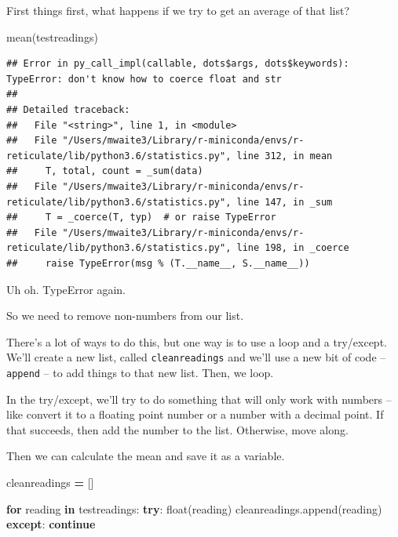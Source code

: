\documentclass[
]{book}
\newenvironment{Shaded}{\begin{snugshade}}{\end{snugshade}}
\newcommand{\BuiltInTok}[1]{#1}
\newcommand{\ControlFlowTok}[1]{\textcolor[rgb]{0.13,0.29,0.53}{\textbf{#1}}}
\newcommand{\KeywordTok}[1]{\textcolor[rgb]{0.13,0.29,0.53}{\textbf{#1}}}
\newcommand{\NormalTok}[1]{#1}
\newcommand{\OperatorTok}[1]{\textcolor[rgb]{0.81,0.36,0.00}{\textbf{#1}}}
\begin{document}
First things first, what happens if we try to get an average of that list?

\begin{Shaded}
\begin{Highlighting}[]
\NormalTok{mean(testreadings)}
\end{Highlighting}
\end{Shaded}

\begin{verbatim}
## Error in py_call_impl(callable, dots$args, dots$keywords): TypeError: don't know how to coerce float and str
## 
## Detailed traceback: 
##   File "<string>", line 1, in <module>
##   File "/Users/mwaite3/Library/r-miniconda/envs/r-reticulate/lib/python3.6/statistics.py", line 312, in mean
##     T, total, count = _sum(data)
##   File "/Users/mwaite3/Library/r-miniconda/envs/r-reticulate/lib/python3.6/statistics.py", line 147, in _sum
##     T = _coerce(T, typ)  # or raise TypeError
##   File "/Users/mwaite3/Library/r-miniconda/envs/r-reticulate/lib/python3.6/statistics.py", line 198, in _coerce
##     raise TypeError(msg % (T.__name__, S.__name__))
\end{verbatim}

Uh oh. TypeError again.

So we need to remove non-numbers from our list.

There's a lot of ways to do this, but one way is to use a loop and a try/except. We'll create a new list, called \texttt{cleanreadings} and we'll use a new bit of code -- \texttt{append} -- to add things to that new list. Then, we loop.

In the try/except, we'll try to do something that will only work with numbers -- like convert it to a floating point number or a number with a decimal point. If that succeeds, then add the number to the list. Otherwise, move along.

Then we can calculate the mean and save it as a variable.

\begin{Shaded}
\begin{Highlighting}[]

\NormalTok{cleanreadings }\OperatorTok{=}\NormalTok{ []}

\ControlFlowTok{for}\NormalTok{ reading }\KeywordTok{in}\NormalTok{ testreadings:}
    \ControlFlowTok{try}\NormalTok{:}
        \BuiltInTok{float}\NormalTok{(reading)}
\NormalTok{        cleanreadings.append(reading)}
    \ControlFlowTok{except}\NormalTok{:}
        \ControlFlowTok{continue}
        
\end{Highlighting}
\end{Shaded}
\end{document}
